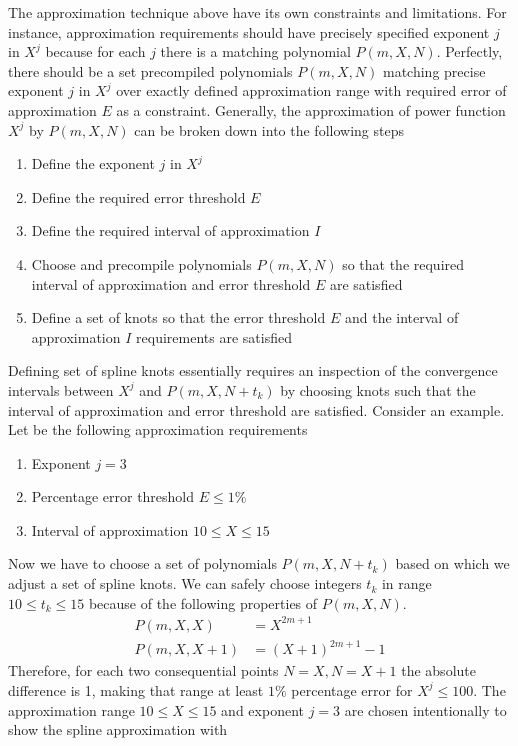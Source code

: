 The approximation technique above have its own constraints and limitations.
For instance, approximation requirements should have precisely specified exponent $j$ in $X^j$ because
for each $j$ there is a matching polynomial $P(m,X,N)$.
Perfectly, there should be a set precompiled polynomials $P(m,X,N)$ matching precise exponent $j$ in $X^j$ over
exactly defined approximation range with required error of approximation $E$ as a constraint.
Generally, the approximation of power function $X^j$ by $P(m,X,N)$ can be broken down into the following steps
\begin{enumerate}
    \item Define the exponent $j$ in $X^j$
    \item Define the required error threshold $E$
    \item Define the required interval of approximation $I$
    \item Choose and precompile polynomials $P(m,X,N)$
    so that the required interval of approximation and error threshold $E$ are satisfied
    \item Define a set of knots so that the error threshold $E$ and the interval of approximation $I$ requirements are satisfied
\end{enumerate}
Defining set of spline knots essentially requires an inspection of the
convergence intervals between $X^j$ and $P(m,X,N+t_k)$
by choosing knots such that the interval of approximation and error threshold are satisfied.
Consider an example.
Let be the following approximation requirements
\begin{enumerate}
    \item Exponent $j=3$
    \item Percentage error threshold $E\leq 1\%$
    \item Interval of approximation $10 \leq X \leq 15$
\end{enumerate}
Now we have to choose a set of polynomials $P(m, X, N+t_k)$ based on which we adjust a set of spline knots.
We can safely choose integers $t_k$ in range $10 \leq t_k \leq 15$ because
of the following properties of $P(m,X, N)$.
\begin{align*}
    P(m,X, X) &= X^{2m+1} \\
    P(m,X, X+1) &= (X+1)^{2m+1} - 1
\end{align*}
Therefore, for each two consequential points $N=X, N=X+1$ the absolute difference is 1, making that range
at least $1\%$ percentage error for $X^j \leq 100$.
The approximation range $10 \leq X \leq 15$ and exponent $j=3$ are chosen intentionally to show the spline approximation with
